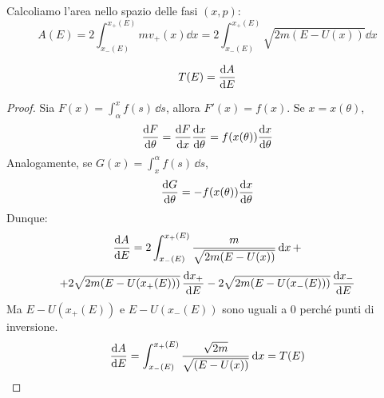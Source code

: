 Calcoliamo l'area nello spazio delle fasi $(x, p)$:
\begin{equation}
    A(E )= 2\int_{x_-(E)}^{x_+(E )}m v_+(x)\dd{x}= 2\int_{x_-(E)}^{x_+(E )} \sqrt{2m\left( E-U(x) \right)}\dd{x}
\end{equation}
\begin{proposition}
    \begin{equation}
        T(E )= \dv{A}{E}(E )    
    \end{equation}
\end{proposition}
\begin{proof}
    Sia $F(x) = \int_{\alpha}^{x} f(s)\,\dd{s}$, allora $F'(x) = f(x)$. Se $x = x(\theta)$,
    \begin{equation*}
        \dv{F}{\theta} = \dv{F}{x} \dv{x}{\theta} = f(x(\theta)) \dv{x}{\theta}
    \end{equation*}
    Analogamente, se $G(x) = \int_{x}^{\alpha} f(s)\,\dd{s}$,
    \begin{equation*}
        \dv{G}{\theta} = -f(x(\theta)) \dv{x}{\theta}
    \end{equation*}
    Dunque:
    \begin{equation*}
        \dv{A}{E} = 
        2 \int_{x_-(E)}^{x_+(E)} \frac{ m}{\sqrt{2m(E - U(x))}} \dd{x} + 
    \end{equation*}
    \begin{equation*}
        + 2 \sqrt{2m(E - U(x_+(E)))} \, \dv{x_+}{E}
        - 2 \sqrt{2m(E - U(x_-(E)))} \, \dv{x_-}{E}
    \end{equation*}
    Ma $E - U(x_+(E))$ e $E - U(x_-(E))$ sono uguali a $0$ perché punti di inversione.
    \begin{equation*}
        \dv{A}{E} = 
         \int_{x_-(E)}^{x_+(E)} \frac{ \sqrt{2m}}{\sqrt{(E - U(x))}} \dd{x}= T(E)
    \end{equation*}
\end{proof}


